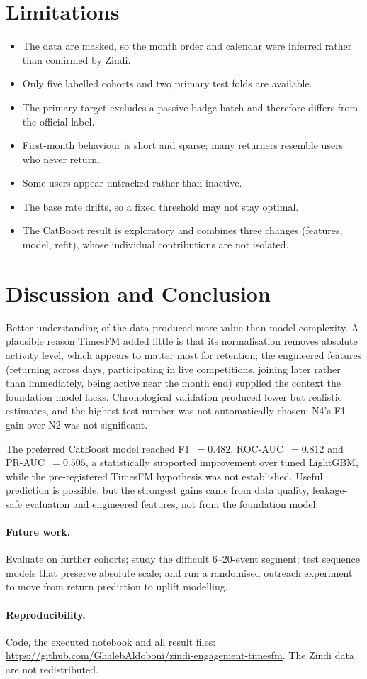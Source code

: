 \documentclass[11pt,a4paper]{article}
\begin{document}
\section{Limitations}
\begin{itemize}
  \item The data are masked, so the month order and calendar were inferred rather than confirmed by Zindi.
  \item Only five labelled cohorts and two primary test folds are available.
  \item The primary target excludes a passive badge batch and therefore differs from the official label.
  \item First-month behaviour is short and sparse; many returners resemble users who never return.
  \item Some users appear untracked rather than inactive.
  \item The base rate drifts, so a fixed threshold may not stay optimal.
  \item The CatBoost result is exploratory and combines three changes (features, model, refit), whose individual contributions are not isolated.
\end{itemize}

\section{Discussion and Conclusion}
Better understanding of the data produced more value than model complexity. A plausible reason TimesFM added
little is that its normalisation removes absolute activity level, which appears to matter most for retention;
the engineered features (returning across days, participating in live competitions, joining later rather than
immediately, being active near the month end) supplied the context the foundation model lacks. Chronological validation produced lower but realistic
estimates, and the highest test number was not automatically chosen: N4's F1 gain over N2 was not
significant.

The preferred CatBoost model reached F1~$=0.482$, ROC-AUC~$=0.812$ and PR-AUC~$=0.505$, a statistically
supported improvement over tuned LightGBM, while the pre-registered TimesFM hypothesis was not established.
Useful prediction is possible, but the strongest gains came from data quality, leakage-safe evaluation and
engineered features, not from the foundation model.

\paragraph{Future work.} Evaluate on further cohorts; study the difficult 6--20-event segment; test sequence
models that preserve absolute scale; and run a randomised outreach experiment to move from return prediction
to uplift modelling.

\paragraph{Reproducibility.} Code, the executed notebook and all result files:
\url{https://github.com/GhalebAldoboni/zindi-engagement-timesfm}. The Zindi data are not redistributed.



\end{document}
